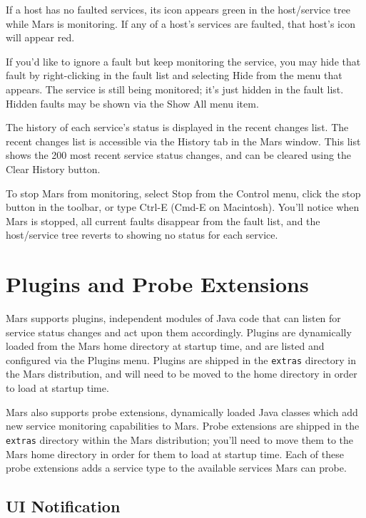 \documentclass{article}
\newcommand{\filename}[1]{{\tt #1}}
\newcommand{\guiitem}[1]{{\sf #1}}
\newcommand{\keystroke}[1]{{\sf #1}}
\begin{document}
If a host has no faulted services, its icon appears green in the
host/service tree while Mars is monitoring. If any of a host's
services are faulted, that host's icon will appear red.

If you'd like to ignore a fault but keep monitoring the service, you
may hide that fault by right-clicking in the fault list and selecting
\guiitem{Hide} from the menu that appears. The service is still being
monitored; it's just hidden in the fault list. Hidden faults may be
shown via the \guiitem{Show All} menu item.

The history of each service's status is displayed in the recent
changes list.  The recent changes list is accessible via the
\guiitem{History} tab in the Mars window.  This list shows the 200
most recent service status changes, and can be cleared using the
\guiitem{Clear History} button.

To stop Mars from monitoring, select \guiitem{Stop} from the
\guiitem{Control} menu, click the stop button in the toolbar, or type
\keystroke{Ctrl-E} (\keystroke{Cmd-E} on Macintosh). You'll notice
when Mars is stopped, all current faults disappear from the fault
list, and the host/service tree reverts to showing no status for each
service.

\section{Plugins and Probe Extensions}
\label{sec_extension}

Mars supports plugins, independent modules of Java code that can
listen for service status changes and act upon them
accordingly. Plugins are dynamically loaded from the Mars home
directory at startup time, and are listed and configured via the
\guiitem {Plugins} menu.  Plugins are shipped in the \filename{extras}
directory in the Mars distribution, and will need to be moved to the
home directory in order to load at startup time.

Mars also supports probe extensions, dynamically loaded Java classes
which add new service monitoring capabilities to Mars. Probe
extensions are shipped in the \filename{extras} directory within the
Mars distribution; you'll need to move them to the Mars home directory
in order for them to load at startup time. Each of these probe
extensions adds a service type to the available services Mars can
probe.

\subsection{UI Notification}
\end{document}
